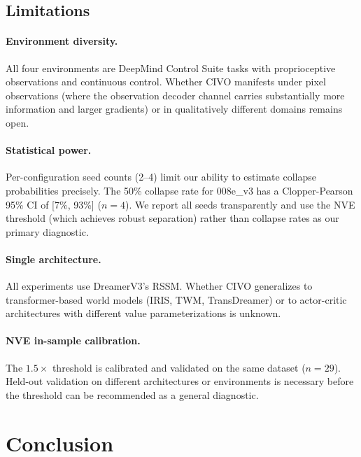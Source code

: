 \documentclass[10pt,letterpaper]{article}
\begin{document}
\subsection{Limitations}

\paragraph{Environment diversity.}
All four environments are DeepMind Control Suite tasks with proprioceptive observations and continuous control. Whether CIVO manifests under pixel observations (where the observation decoder channel carries substantially more information and larger gradients) or in qualitatively different domains remains open.

\paragraph{Statistical power.}
Per-configuration seed counts (2--4) limit our ability to estimate collapse probabilities precisely. The 50\% collapse rate for 008e\_v3 has a Clopper-Pearson 95\% CI of [7\%, 93\%] ($n = 4$). We report all seeds transparently and use the NVE threshold (which achieves robust separation) rather than collapse rates as our primary diagnostic.

\paragraph{Single architecture.}
All experiments use DreamerV3's RSSM. Whether CIVO generalizes to transformer-based world models (IRIS, TWM, TransDreamer) or to actor-critic architectures with different value parameterizations is unknown.

\paragraph{NVE in-sample calibration.}
The $1.5\times$ threshold is calibrated and validated on the same dataset ($n = 29$). Held-out validation on different architectures or environments is necessary before the threshold can be recommended as a general diagnostic.

\section{Conclusion}
\label{sec:conclusion}
\end{document}
